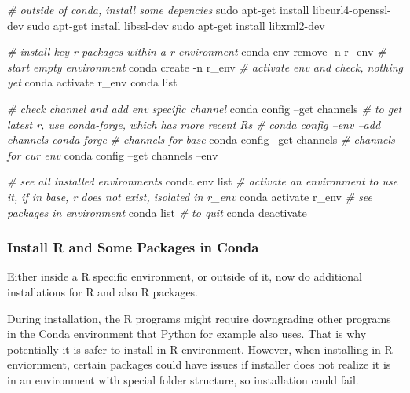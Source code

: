 \documentclass[]{article}
\newenvironment{Shaded}{\begin{snugshade}}{\end{snugshade}}
\newcommand{\CommentTok}[1]{\textcolor[rgb]{0.56,0.35,0.01}{\textit{#1}}}
\newcommand{\ExtensionTok}[1]{#1}
\newcommand{\FunctionTok}[1]{\textcolor[rgb]{0.00,0.00,0.00}{#1}}
\newcommand{\NormalTok}[1]{#1}
\begin{document}
\begin{Shaded}
\begin{Highlighting}[]
\CommentTok{# outside of conda, install some depencies}
\FunctionTok{sudo}\NormalTok{ apt-get install libcurl4-openssl-dev}
\FunctionTok{sudo}\NormalTok{ apt-get install libssl-dev}
\FunctionTok{sudo}\NormalTok{ apt-get install libxml2-dev}

\CommentTok{# install key r packages within a r-environment}
\ExtensionTok{conda}\NormalTok{ env remove -n r_env}
\CommentTok{# start empty environment}
\ExtensionTok{conda}\NormalTok{ create -n r_env}
\CommentTok{# activate env and check, nothing yet}
\ExtensionTok{conda}\NormalTok{ activate r_env}
\ExtensionTok{conda}\NormalTok{ list}

\CommentTok{# check channel and add env specific channel}
\ExtensionTok{conda}\NormalTok{ config --get channels}
\CommentTok{# to get latest r, use conda-forge, which has more recent Rs}
\CommentTok{# conda config --env --add channels conda-forge}
\CommentTok{# channels for base}
\ExtensionTok{conda}\NormalTok{ config --get channels}
\CommentTok{# channels for cur env}
\ExtensionTok{conda}\NormalTok{ config --get channels --env}

\CommentTok{# see all installed environments}
\ExtensionTok{conda}\NormalTok{ env list}
\CommentTok{# activate an environment to use it, if in base, r does not exist, isolated in r_env}
\ExtensionTok{conda}\NormalTok{ activate r_env}
\CommentTok{# see packages in environment}
\ExtensionTok{conda}\NormalTok{ list}
\CommentTok{# to quit}
\ExtensionTok{conda}\NormalTok{ deactivate}
\end{Highlighting}
\end{Shaded}

\hypertarget{install-r-and-some-packages-in-conda}{%
\subsubsection{Install R and Some Packages in
Conda}\label{install-r-and-some-packages-in-conda}}

Either inside a R specific environment, or outside of it, now do
additional installations for R and also R packages.

During installation, the R programs might require downgrading other
programs in the Conda environment that Python for example also uses.
That is why potentially it is safer to install in R environment.
However, when installing in R enviornment, certain packages could have
issues if installer does not realize it is in an environment with
special folder structure, so installation could fail.
\end{document}

